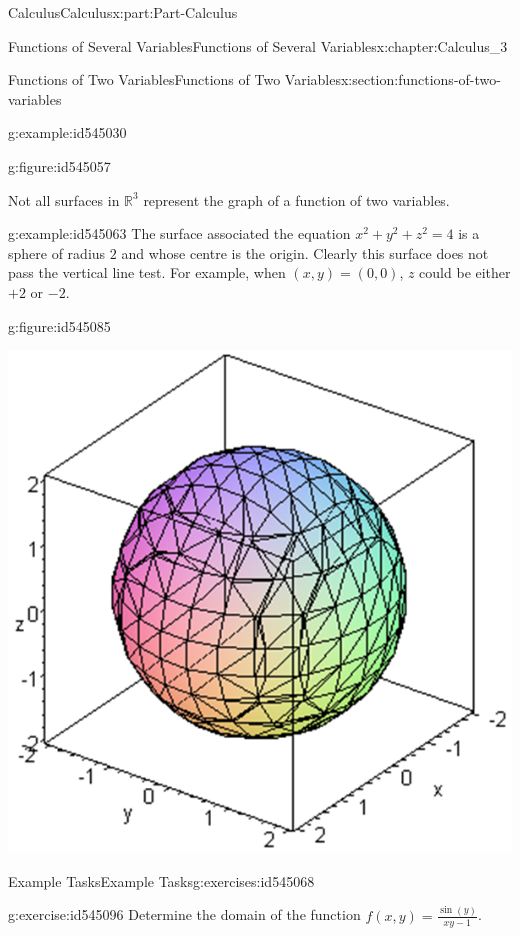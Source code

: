 \documentclass[oneside,10pt,]{book}
\numberwithin{equation}{section}
\begin{document}
\begin{partptx}{Calculus}{}{Calculus}{}{}{x:part:Part-Calculus}
\begin{chapterptx}{Functions of Several Variables}{}{Functions of Several Variables}{}{}{x:chapter:Calculus_3}
\begin{sectionptx}{Functions of Two Variables}{}{Functions of Two Variables}{}{}{x:section:functions-of-two-variables}
\begin{example}{}{g:example:id545030}
\begin{figureptx}{}{g:figure:id545057}{}
\tcblower
\end{figureptx}%
%
\end{example}
Not all surfaces in \(\mathbb{R}^3\) represent the graph of a function of two variables.%
\begin{example}{}{g:example:id545063}%
The surface associated the equation \(x^2+y^2+z^2=4\) is a sphere of radius \(2\) and whose centre is the origin. Clearly this surface does not pass the vertical line test. For example, when \((x,y)=(0,0)\), \(z\) could be either \(+2\) or \(-2\). \begin{figureptx}{}{g:figure:id545085}{}%
\begin{image}{0.125}{0.75}{0.125}%
\includegraphics[width=\linewidth]{./Calculus/Images/3/1_example7.png}
\end{image}%
\tcblower
\end{figureptx}%
%
\end{example}
%
%
\typeout{************************************************}
\typeout{************************************************}
%
\begin{exercises-subsection-numberless}{Example Tasks}{}{Example Tasks}{}{}{g:exercises:id545068}
\begin{divisionexercise}{1}{}{}{g:exercise:id545096}%
Determine the domain of the function \(f(x,y)=\frac{\sin(y)}{xy-1}\).%

\end{divisionexercise}
\end{exercises-subsection-numberless}
\end{sectionptx}
\end{chapterptx}
\end{partptx}
\end{document}

